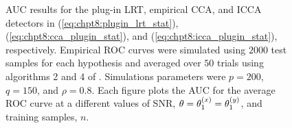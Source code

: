 \begin{figure} 
  \caption{AUC results for the plug-in LRT, empirical CCA, and ICCA detectors in
    (\ref{eq:chpt8:plugin_lrt_stat}), (\ref{eq:chpt8:cca_plugin_stat}), and
    (\ref{eq:chpt8:icca_plugin_stat}), respectively. Empirical ROC curves were simulated using
    $2000$ test samples for each hypothesis and averaged over $50$ trials using
    algorithms 2 and 4 of \cite{fawcett2006introduction}. Simulations parameters were
    $p=200$, $q=150$, and $\rho=0.8$. Each figure plots the AUC for the average ROC curve
    at a different values of SNR, $\theta=\theta^{(x)}_1=\theta^{(y)}_1$, and training samples, $n$.}
  \label{fig:chpt8:auc_high_rho}
\end{figure}

